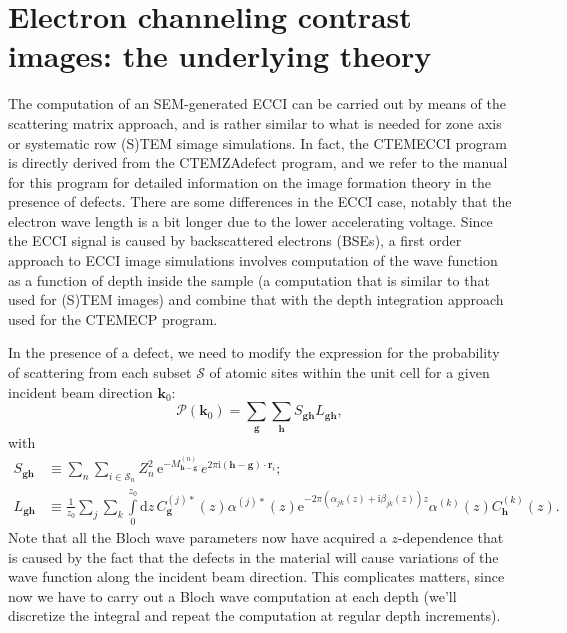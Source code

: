 \documentclass[DIV=calc, paper=letter, fontsize=11pt]{scrartcl}	 %
\begin{document}
\section{Electron channeling contrast images: the underlying theory\label{sec:theory}}
The computation of an SEM-generated ECCI can be carried out by means of the scattering matrix approach, and is rather similar to 
what is needed for zone axis or systematic row (S)TEM simage simulations.  In fact, the \textsf{CTEMECCI} program is directly 
derived from the \textsf{CTEMZAdefect} program, and we refer to the manual for this program for detailed information on the 
image formation theory in the presence of defects.  There are some differences in the ECCI case, notably that the electron wave length is a bit longer due 
to the lower accelerating voltage.  Since the ECCI signal is caused by backscattered electrons (BSEs), a first order approach to 
ECCI image simulations involves computation of the wave function as a function of depth inside the sample (a computation that is similar 
to that used for (S)TEM images) and combine that with the depth integration approach used for the \textsf{CTEMECP} program.

In the presence of a defect, we need to modify the expression for the probability of scattering from each subset $\mathcal{S}$ of atomic sites within the 
unit cell for a given incident beam direction $\mathbf{k}_0$:
\begin{equation}
	\mathcal{P}(\mathbf{k}_0) = \sum_{\mathbf{g}} 
    \sum_{\mathbf{h}} S_{\mathbf{g}\mathbf{h}}L_{\mathbf{g}\mathbf{h}},
    \label{eq:prob}
\end{equation}
with
\begin{subequations}
\begin{align}
    S_{\mathbf{g}\mathbf{h}} &\equiv \sum_{n}\sum_{i\in\mathcal{S}_n} Z^2_n\,\mathrm{e}^{-M^{(n)}_{\mathbf{h}-\mathbf{g}}}\,e^{2\pi\mathrm{i} 
    (\mathbf{h}-\mathbf{g})\cdot\mathbf{r}_{i}};\label{eq:defa}\\
    L_{\mathbf{g}\mathbf{h}} &\equiv \frac{1}{z_{0}}\sum_{j}\sum_{k}\int\limits_{0}^{z_{0}} \mathrm{d}z\, 
    C^{(j)\ast}_{\mathbf{g}}(z)\alpha^{(j)\ast}(z) \mathrm{e}^{-2\pi(\alpha_{jk}(z)+\mathrm{i}\beta_{jk}(z))z} \alpha^{(k)}(z)
    C^{(k)}_{\mathbf{h}}(z).\label{eq:defb}
\end{align}
\end{subequations}
Note that all the Bloch wave parameters now have acquired a $z$-dependence that is caused by the fact that the defects in the 
material will cause variations of the wave function along the incident beam direction.  This complicates matters, since now
we have to carry out a Bloch wave computation at each depth (we'll discretize the integral and repeat the computation at regular
depth increments).  
\end{document}
